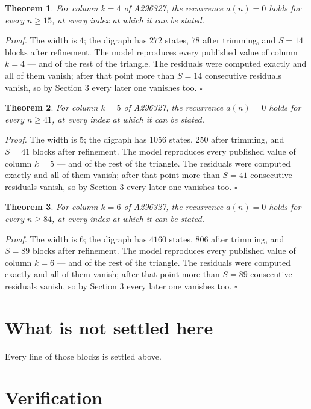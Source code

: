 \documentclass[11pt]{article}
\newtheorem{theorem}{Theorem}
\theoremstyle{definition}
\begin{document}
\begin{theorem} For column $k = 4$ of A296327, the recurrence $a(n) = 0$ holds for every $n \ge 15$, at every index at which it can be stated.\end{theorem}

{\itshape Proof.} The width is $4$; the digraph has $272$ states, $78$ after trimming, and $S = 14$ blocks after refinement. The model reproduces every published value of column $k = 4$ --- and of the rest of the triangle. The residuals were computed exactly and all of them vanish; after that point more than $S = 14$ consecutive residuals vanish, so by Section 3 every later one vanishes too. $\square$

\begin{theorem} For column $k = 5$ of A296327, the recurrence $a(n) = 0$ holds for every $n \ge 41$, at every index at which it can be stated.\end{theorem}

{\itshape Proof.} The width is $5$; the digraph has $1056$ states, $250$ after trimming, and $S = 41$ blocks after refinement. The model reproduces every published value of column $k = 5$ --- and of the rest of the triangle. The residuals were computed exactly and all of them vanish; after that point more than $S = 41$ consecutive residuals vanish, so by Section 3 every later one vanishes too. $\square$

\begin{theorem} For column $k = 6$ of A296327, the recurrence $a(n) = 0$ holds for every $n \ge 84$, at every index at which it can be stated.\end{theorem}

{\itshape Proof.} The width is $6$; the digraph has $4160$ states, $806$ after trimming, and $S = 89$ blocks after refinement. The model reproduces every published value of column $k = 6$ --- and of the rest of the triangle. The residuals were computed exactly and all of them vanish; after that point more than $S = 89$ consecutive residuals vanish, so by Section 3 every later one vanishes too. $\square$

\section{What is not settled here}

Every line of those blocks is settled above.

\section{Verification}
\end{document}
